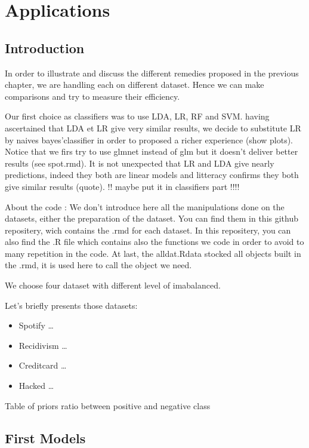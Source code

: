 \documentclass[
]{book}
\providecommand{\tightlist}{%
  \setlength{\itemsep}{0pt}\setlength{\parskip}{0pt}}
\begin{document}
\hypertarget{applications}{%
\chapter{Applications}\label{applications}}

\hypertarget{introduction-1}{%
\section{Introduction}\label{introduction-1}}

In order to illustrate and discuss the different remedies proposed in the previous chapter, we are handling each on different dataset. Hence we can make comparisons and try to measure their efficiency.

Our first choice as classifiers was to use LDA, LR, RF and SVM. having ascertained that LDA et LR give very similar results, we decide to substitute LR by naives bayes'classifier in order to proposed a richer experience (show plots). Notice that we firs try to use glmnet instead of glm but it doesn't deliver better results (see spot.rmd). It is not unexpected that LR and LDA give nearly predictions, indeed they both are linear models and litteracy confirms they both give similar results (quote). !! maybe put it in classifiers part !!!!

About the code : We don't introduce here all the manipulations done on the datasets, either the preparation of the dataset. You can find them in this github repositery, wich contains the .rmd for each dataset. In this repositery, you can also find the .R file which contains also the functions we code in order to avoid to many repetition in the code. At last, the alldat.Rdata stocked all objects built in the .rmd, it is used here to call the object we need.

We choose four dataset with different level of imabalanced.

Let's briefly presents those datasets:

\begin{itemize}
\tightlist
\item
  Spotify \ldots{}
\item
  Recidivism \ldots{}
\item
  Creditcard \ldots{}
\item
  Hacked \ldots{}
\end{itemize}

Table of priors ratio between positive and negative class

\hypertarget{first-models}{%
\section{First Models}\label{first-models}}
\end{document}
